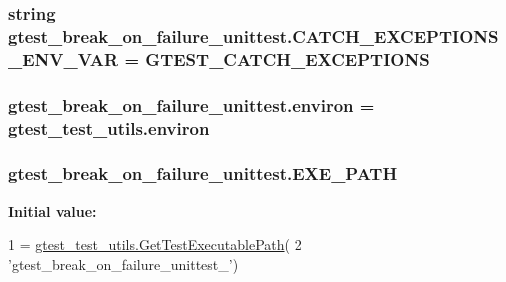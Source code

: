 \subsubsection[{\texorpdfstring{C\+A\+T\+C\+H\+\_\+\+E\+X\+C\+E\+P\+T\+I\+O\+N\+S\+\_\+\+E\+N\+V\+\_\+\+V\+AR}{CATCH_EXCEPTIONS_ENV_VAR}}]{\setlength{\rightskip}{0pt plus 5cm}string gtest\+\_\+break\+\_\+on\+\_\+failure\+\_\+unittest.\+C\+A\+T\+C\+H\+\_\+\+E\+X\+C\+E\+P\+T\+I\+O\+N\+S\+\_\+\+E\+N\+V\+\_\+\+V\+AR = \textquotesingle{}G\+T\+E\+S\+T\+\_\+\+C\+A\+T\+C\+H\+\_\+\+E\+X\+C\+E\+P\+T\+I\+O\+NS\textquotesingle{}}\hypertarget{namespacegtest__break__on__failure__unittest_a0c1cd8079b97c6924156075c6c9733c3}{}\label{namespacegtest__break__on__failure__unittest_a0c1cd8079b97c6924156075c6c9733c3}
\subsubsection[{\texorpdfstring{environ}{environ}}]{\setlength{\rightskip}{0pt plus 5cm}gtest\+\_\+break\+\_\+on\+\_\+failure\+\_\+unittest.\+environ = gtest\+\_\+test\+\_\+utils.\+environ}\hypertarget{namespacegtest__break__on__failure__unittest_a6d74240e4ea26e0a68e1025f9b8c878d}{}\label{namespacegtest__break__on__failure__unittest_a6d74240e4ea26e0a68e1025f9b8c878d}
\subsubsection[{\texorpdfstring{E\+X\+E\+\_\+\+P\+A\+TH}{EXE_PATH}}]{\setlength{\rightskip}{0pt plus 5cm}gtest\+\_\+break\+\_\+on\+\_\+failure\+\_\+unittest.\+E\+X\+E\+\_\+\+P\+A\+TH}\hypertarget{namespacegtest__break__on__failure__unittest_a4c5b1b2e2a550d75bf9f38ef24e76702}{}\label{namespacegtest__break__on__failure__unittest_a4c5b1b2e2a550d75bf9f38ef24e76702}
{\bfseries Initial value\+:}
\begin{DoxyCode}
1 = \hyperlink{namespacegtest__test__utils_a89ed3717984a80ffbb7a9c92f71b86a2}{gtest\_test\_utils.GetTestExecutablePath}(
2     \textcolor{stringliteral}{'gtest\_break\_on\_failure\_unittest\_'})
\end{DoxyCode}
